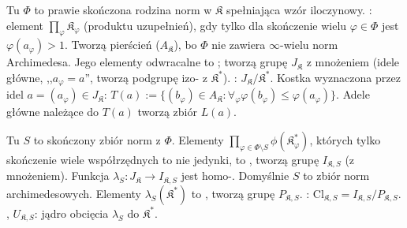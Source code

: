 
Tu  $\Phi$ to prawie skończona rodzina norm w $\mathfrak K$ spełniająca wzór iloczynowy.
: element $\prod_\varphi \mathfrak K_\varphi$ (produktu uzupełnień), gdy tylko dla skończenie wielu $\varphi \in \Phi$ jest $\varphi(a_\varphi) > 1$.
Tworzą pierścień ($A_{\mathfrak K}$), bo $\Phi$ nie zawiera $\infty$-wielu norm Archimedesa.
Jego elementy odwracalne to ; tworzą grupę $J_{\mathfrak K}$ z mnożeniem (idele główne, ,,$a_\varphi = a$'', tworzą podgrupę izo- z $\mathfrak K^*$).
: $J_{\mathfrak K} / \mathfrak K^*$.
Kostka wyznaczona przez idel $a = (a_\varphi) \in J_{\mathfrak K}$: $T(a) := \{(b_\varphi) \in A_{\mathfrak K} : \forall_\varphi \varphi(b_\varphi) \le \varphi(a_\varphi) \}$.
Adele główne należące do $T(a)$ tworzą zbiór $L(a)$.

Tu  $S$ to skończony zbiór norm z $\Phi$.
Elementy $\prod_{\varphi \in \Phi \setminus S} \phi(\mathfrak K^*_\varphi)$, których tylko skończenie wiele współrzędnych to nie jedynki, to , tworzą grupę $I_{\mathfrak K, S}$ (z mnożeniem).
Funkcja $\lambda_S \colon J_{\mathfrak K} \to I_{\mathfrak K, S}$ jest homo-.
Domyślnie $S$ to zbiór norm archimedesowych.
Elementy $\lambda_S(\mathfrak K^*)$ to , tworzą grupę $P_{\mathfrak K, S}$.
: $\textrm{Cl}_{\mathfrak K, S} = I_{\mathfrak K, S} / P_{\mathfrak K, S}$.
, $U_{\mathfrak K, S}$: jądro obcięcia $\lambda_S$ do $\mathfrak K^*$.

